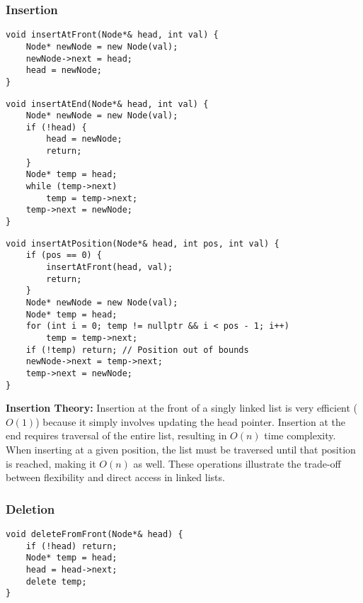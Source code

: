 \subsubsection{Insertion}
\begin{lstlisting}[style=cppstyle, caption={Insert at Front in Singly Linked List}]
void insertAtFront(Node*& head, int val) {
    Node* newNode = new Node(val);
    newNode->next = head;
    head = newNode;
}
\end{lstlisting}

\begin{lstlisting}[style=cppstyle, caption={Insert at End in Singly Linked List}]
void insertAtEnd(Node*& head, int val) {
    Node* newNode = new Node(val);
    if (!head) {
        head = newNode;
        return;
    }
    Node* temp = head;
    while (temp->next)
        temp = temp->next;
    temp->next = newNode;
}
\end{lstlisting}

\begin{lstlisting}[style=cppstyle, caption={Insert at Position in Singly Linked List}]
void insertAtPosition(Node*& head, int pos, int val) {
    if (pos == 0) {
        insertAtFront(head, val);
        return;
    }
    Node* newNode = new Node(val);
    Node* temp = head;
    for (int i = 0; temp != nullptr && i < pos - 1; i++)
        temp = temp->next;
    if (!temp) return; // Position out of bounds
    newNode->next = temp->next;
    temp->next = newNode;
}
\end{lstlisting}

\textbf{Insertion Theory:} Insertion at the front of a singly linked list is very efficient (\(O(1)\)) because it simply involves updating the head pointer. Insertion at the end requires traversal of the entire list, resulting in \(O(n)\) time complexity. When inserting at a given position, the list must be traversed until that position is reached, making it \(O(n)\) as well. These operations illustrate the trade-off between flexibility and direct access in linked lists.

\subsubsection{Deletion}
\begin{lstlisting}[style=cppstyle, caption={Delete from Front in Singly Linked List}]
void deleteFromFront(Node*& head) {
    if (!head) return;
    Node* temp = head;
    head = head->next;
    delete temp;
}
\end{lstlisting}

